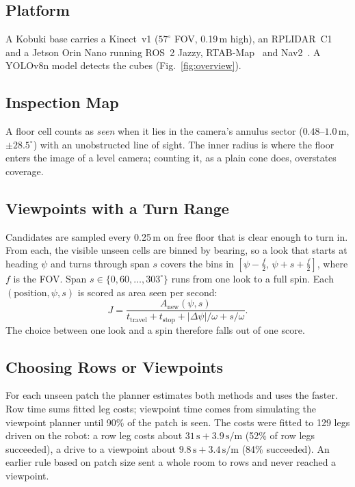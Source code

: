 \documentclass[conference,a4paper,10pt]{IEEEtran}
\begin{document}
\subsection{Platform}
A Kobuki base carries a Kinect~v1 (\(57^{\circ}\) FOV, 0.19\,m high), an
RPLIDAR~C1 and a Jetson Orin Nano running ROS~2 Jazzy, RTAB-Map~\cite{rtabmap}
and Nav2~\cite{nav2}. A YOLOv8n model detects the cubes (Fig.~\ref{fig:overview}).

\subsection{Inspection Map}
A floor cell counts as \emph{seen} when it lies in the camera's annulus sector
(\(0.48\)--\(1.0\,\mathrm{m}\), \(\pm 28.5^{\circ}\)) with an unobstructed line of
sight. The inner radius is where the floor enters the image of a level camera;
counting it, as a plain cone does, overstates coverage.

\subsection{Viewpoints with a Turn Range}
Candidates are sampled every 0.25\,m on free floor that is clear enough to turn
in. From each, the visible unseen cells are binned by bearing, so a look that
starts at heading \(\psi\) and turns through span \(s\) covers the bins in
\([\psi-\tfrac{f}{2},\,\psi+s+\tfrac{f}{2}]\), where \(f\) is the FOV. Span
\(s\in\{0,60,\dots,303^{\circ}\}\) runs from one look to a full spin. Each
\((\text{position},\psi,s)\) is scored as area seen per second:
\begin{equation}
J=\frac{A_{\text{new}}(\psi,s)}{t_{\text{travel}}+t_{\text{stop}}+
|\Delta\psi|/\omega+s/\omega}.
\end{equation}
The choice between one look and a spin therefore falls out of one score.

\subsection{Choosing Rows or Viewpoints}
For each unseen patch the planner estimates both methods and uses the faster.
Row time sums fitted leg costs; viewpoint time comes from simulating the
viewpoint planner until 90\% of the patch is seen. The costs were fitted to 129
legs driven on the robot: a row leg costs about \(31\,\mathrm{s}+3.9\,\mathrm{s/m}\)
(52\% of row legs succeeded), a drive to a viewpoint about
\(9.8\,\mathrm{s}+3.4\,\mathrm{s/m}\) (84\% succeeded). An earlier rule based on
patch size sent a whole room to rows and never reached a viewpoint.
\end{document}
